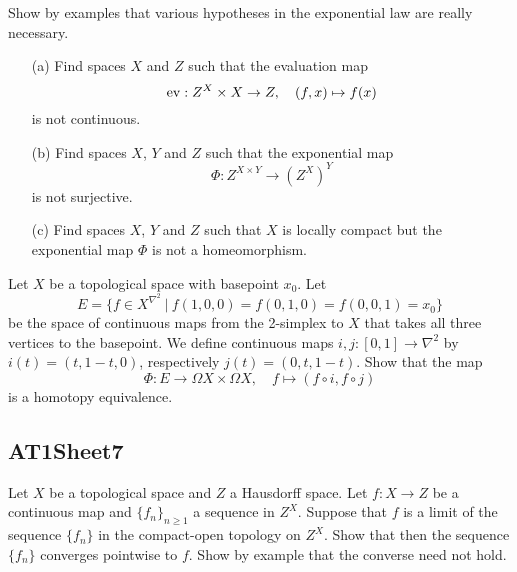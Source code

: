 \begin{sketch}
\end{sketch}

\label{exercise:AT1Sheet6.2}
Show by examples that various hypotheses in the exponential law are really necessary.
\begin{enumerate}
    \item[(a)] Find spaces $X$ and $Z$ such that the evaluation map
    \[
    \operatorname{ev} : Z^X\times X \to Z,\quad (f,x) \mapsto f(x)
    \]
    is not continuous.
    \item[(b)] Find spaces $X$, $Y$ and $Z$ such that the exponential map
    \[\Phi : Z^{X\times Y} \to (Z^X)^Y\]
    is not surjective.
    \item[(c)] Find spaces $X$, $Y$ and $Z$ such that $X$ is locally compact but the exponential map $\Phi$ is not a homeomorphism.
\end{enumerate}

\begin{sketch}
\end{sketch}

\label{exercise:AT1Sheet6.3}
Let $X$ be a topological space with basepoint $x_0$. Let
\[
    E = \{f \in X^{\nabla^2}\ |\ f(1,0,0) = f(0,1,0) = f(0,0,1) = x_0\}
\]
be the space of continuous maps from the 2-simplex to $X$ that takes all three vertices to the basepoint. We define continuous maps
\(i,j : [0,1] \to\nabla^2\)
by \(i(t) = (t,1-t,0)\), respectively \(j(t) = (0,t,1-t)\).
Show that the map
\[\Phi: E \to\Omega X \times \Omega X,\quad f \mapsto (f\circ i,f\circ j)\]
is a homotopy equivalence.

\begin{sketch}
\end{sketch}

\subsection{AT1Sheet7}

\label{exercise:AT1Sheet7.1}
Let $X$ be a topological space and $Z$ a Hausdorff space. Let $f: X \rightarrow Z$ be a continuous map and $\{f_{n}\}_{n \geq 1}$ a sequence in $Z^{X}$. Suppose that $f$ is a limit of the sequence $\{f_{n}\}$ in the compact-open topology on $Z^{X}$. Show that then the sequence $\{f_{n}\}$ converges pointwise to $f$. Show by example that the converse need not hold.

